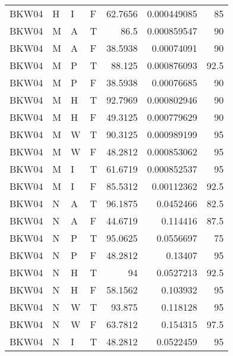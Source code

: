 \begin{longtable}{llllrrr}
    BKW04    & H         & I         & F          & 62.7656    & 0.000449085 & 85       \\
    BKW04    & M         & A         & T          & 86.5       & 0.000859547 & 90       \\
    BKW04    & M         & A         & F          & 38.5938    & 0.00074091  & 90       \\
    BKW04    & M         & P         & T          & 88.125     & 0.000876093 & 92.5     \\
    BKW04    & M         & P         & F          & 38.5938    & 0.00076685  & 90       \\
    BKW04    & M         & H         & T          & 92.7969    & 0.000802946 & 90       \\
    BKW04    & M         & H         & F          & 49.3125    & 0.000779629 & 90       \\
    BKW04    & M         & W         & T          & 90.3125    & 0.000989199 & 95       \\
    BKW04    & M         & W         & F          & 48.2812    & 0.000853062 & 95       \\
    BKW04    & M         & I         & T          & 61.6719    & 0.000852537 & 95       \\
    BKW04    & M         & I         & F          & 85.5312    & 0.00112362  & 92.5     \\
    BKW04    & N         & A         & T          & 96.1875    & 0.0452466   & 82.5     \\
    BKW04    & N         & A         & F          & 44.6719    & 0.114416    & 87.5     \\
    BKW04    & N         & P         & T          & 95.0625    & 0.0556697   & 75       \\
    BKW04    & N         & P         & F          & 48.2812    & 0.13407     & 95       \\
    BKW04    & N         & H         & T          & 94         & 0.0527213   & 92.5     \\
    BKW04    & N         & H         & F          & 58.1562    & 0.103932    & 95       \\
    BKW04    & N         & W         & T          & 93.875     & 0.118128    & 95       \\
    BKW04    & N         & W         & F          & 63.7812    & 0.154315    & 97.5     \\
    BKW04    & N         & I         & T          & 48.2812    & 0.0522459   & 95       \\

\end{longtable}
